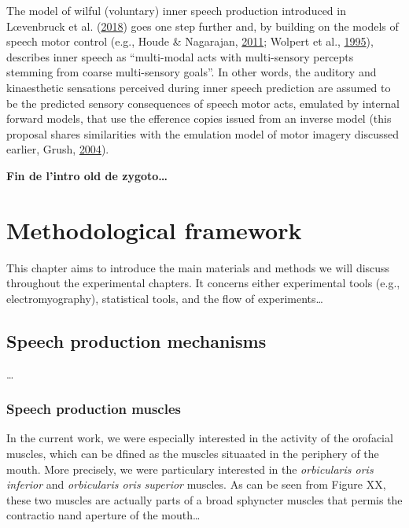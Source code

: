 \documentclass[a4paper,12pt,twoside,openright,oldfontcommands]{memoir}
\begin{document}
The model of wilful (voluntary) inner speech production introduced in
Lœvenbruck et al.
(\protect\hyperlink{ref-loevenbruck_cognitive_2018}{2018}) goes one step
further and, by building on the models of speech motor control (e.g.,
Houde \& Nagarajan, \protect\hyperlink{ref-houde_speech_2011}{2011};
Wolpert et al., \protect\hyperlink{ref-wolpert_internal_1995}{1995}),
describes inner speech as ``multi-modal acts with multi-sensory percepts
stemming from coarse multi-sensory goals''. In other words, the auditory
and kinaesthetic sensations perceived during inner speech prediction are
assumed to be the predicted sensory consequences of speech motor acts,
emulated by internal forward models, that use the efference copies
issued from an inverse model (this proposal shares similarities with the
emulation model of motor imagery discussed earlier, Grush,
\protect\hyperlink{ref-grush_emulation_2004}{2004}).

\textbf{Fin de l'intro old de zygoto\ldots{}}

\chapter{Methodological framework}\label{methodological-framework}

This chapter aims to introduce the main materials and methods we will
discuss throughout the experimental chapters. It concerns either
experimental tools (e.g., electromyography), statistical tools, and the
flow of experiments\ldots{}

\section{Speech production
mechanisms}\label{speech-production-mechanisms}

\ldots{}

\subsection{Speech production muscles}\label{speech-production-muscles}

In the current work, we were especially interested in the activity of
the orofacial muscles, which can be dfined as the muscles situaated in
the periphery of the mouth. More precisely, we were particulary
interested in the \emph{orbicularis oris inferior} and \emph{orbicularis
oris superior} muscles. As can be seen from Figure XX, these two muscles
are actually parts of a broad sphyncter muscles that permis the
contractio nand aperture of the mouth\ldots{}
\end{document}
